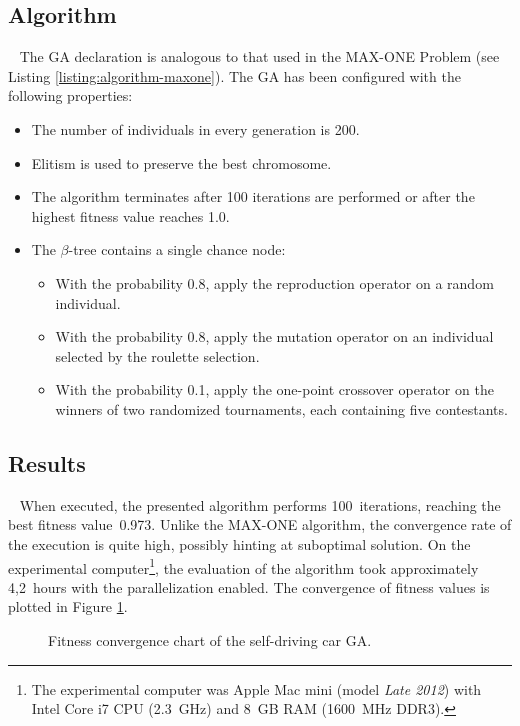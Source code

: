 \subsection{Algorithm}~\label{section:car-algorithm}
The GA declaration is analogous to that used in the MAX-ONE Problem (see Listing \ref{listing:algorithm-maxone}). The GA has been configured with the following properties:
~
\begin{itemize}
	\item The number of individuals in every generation is 200.
	\item Elitism is used to preserve the best chromosome.
	\item The algorithm terminates after 100 iterations are performed or after the highest fitness value reaches 1.0.
	\item The $\beta$-tree contains a single chance node:
	~
	\begin{itemize}
		\item With the probability 0.8, apply the reproduction operator on a random individual.
		\item With the probability 0.8, apply the mutation operator on an individual selected by the roulette selection.
		\item With the probability 0.1, apply the one-point crossover operator on the winners of two randomized tournaments, each containing five contestants.
	\end{itemize}
\end{itemize}

\subsection{Results}~\label{section:car-results}
When executed, the presented algorithm performs 100~iterations, reaching the best fitness value~0.973. Unlike the MAX-ONE algorithm, the convergence rate of the execution is quite high, possibly hinting at suboptimal solution. On the experimental computer\footnote{The experimental computer was Apple Mac mini (model \textit{Late 2012}) with Intel Core i7 CPU (2.3~GHz) and 8~GB RAM (1600~MHz DDR3).}, the evaluation of the algorithm took approximately 4,2~hours with the parallelization enabled. The convergence of fitness values is plotted in Figure \ref{fig:car-fitness}.

\begin{figure}[ht]
	\centering
	\caption{Fitness convergence chart of the self-driving car GA.}
	\label{fig:car-fitness}
\end{figure}

